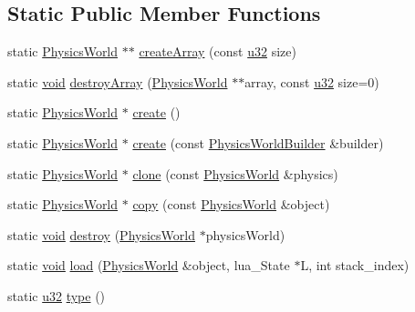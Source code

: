 \subsection*{Static Public Member Functions}
\begin{DoxyCompactItemize}
\item 
static \mbox{\hyperlink{classnjli_1_1_physics_world}{Physics\+World}} $\ast$$\ast$ \mbox{\hyperlink{classnjli_1_1_physics_world_a79e85fb35958b4613526181e9c9bdb86}{create\+Array}} (const \mbox{\hyperlink{_util_8h_a10e94b422ef0c20dcdec20d31a1f5049}{u32}} size)
\item 
static \mbox{\hyperlink{_thread_8h_af1e856da2e658414cb2456cb6f7ebc66}{void}} \mbox{\hyperlink{classnjli_1_1_physics_world_a2abce5fcfb7f547fdd056717ac44247f}{destroy\+Array}} (\mbox{\hyperlink{classnjli_1_1_physics_world}{Physics\+World}} $\ast$$\ast$array, const \mbox{\hyperlink{_util_8h_a10e94b422ef0c20dcdec20d31a1f5049}{u32}} size=0)
\item 
static \mbox{\hyperlink{classnjli_1_1_physics_world}{Physics\+World}} $\ast$ \mbox{\hyperlink{classnjli_1_1_physics_world_a7bbce96ef8fd04a42161cccf07eb1944}{create}} ()
\item 
static \mbox{\hyperlink{classnjli_1_1_physics_world}{Physics\+World}} $\ast$ \mbox{\hyperlink{classnjli_1_1_physics_world_a52397ea3dd323182160d9c39ccdb635b}{create}} (const \mbox{\hyperlink{classnjli_1_1_physics_world_builder}{Physics\+World\+Builder}} \&builder)
\item 
static \mbox{\hyperlink{classnjli_1_1_physics_world}{Physics\+World}} $\ast$ \mbox{\hyperlink{classnjli_1_1_physics_world_a99e15fd93e236e959f2b7ce4a284279c}{clone}} (const \mbox{\hyperlink{classnjli_1_1_physics_world}{Physics\+World}} \&physics)
\item 
static \mbox{\hyperlink{classnjli_1_1_physics_world}{Physics\+World}} $\ast$ \mbox{\hyperlink{classnjli_1_1_physics_world_a03aca8773a10c85fd06e045542104e1c}{copy}} (const \mbox{\hyperlink{classnjli_1_1_physics_world}{Physics\+World}} \&object)
\item 
static \mbox{\hyperlink{_thread_8h_af1e856da2e658414cb2456cb6f7ebc66}{void}} \mbox{\hyperlink{classnjli_1_1_physics_world_a6d6e3b4603d5804e69c6644094c11cc4}{destroy}} (\mbox{\hyperlink{classnjli_1_1_physics_world}{Physics\+World}} $\ast$physics\+World)
\item 
static \mbox{\hyperlink{_thread_8h_af1e856da2e658414cb2456cb6f7ebc66}{void}} \mbox{\hyperlink{classnjli_1_1_physics_world_ac46ba955f16710f12fd0a57ccf5ed7f0}{load}} (\mbox{\hyperlink{classnjli_1_1_physics_world}{Physics\+World}} \&object, lua\+\_\+\+State $\ast$L, int stack\+\_\+index)
\item 
static \mbox{\hyperlink{_util_8h_a10e94b422ef0c20dcdec20d31a1f5049}{u32}} \mbox{\hyperlink{classnjli_1_1_physics_world_adfed64f0c077cb328745d8ad18a5e217}{type}} ()
\end{DoxyCompactItemize}
